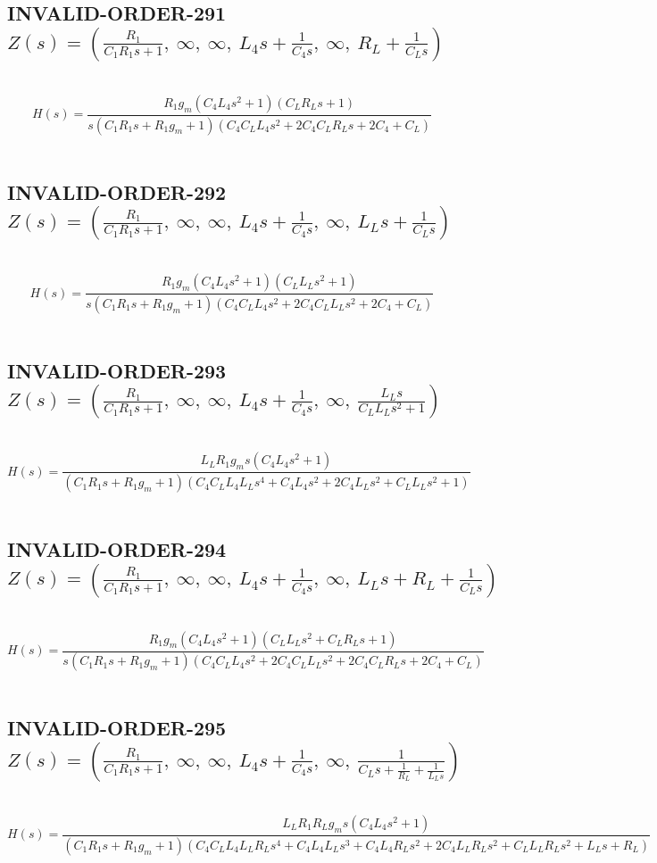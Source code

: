 \documentclass{article}
\begin{document}
\subsection{INVALID-ORDER-291 $Z(s) = \left( \frac{R_{1}}{C_{1} R_{1} s + 1}, \  \infty, \  \infty, \  L_{4} s + \frac{1}{C_{4} s}, \  \infty, \  R_{L} + \frac{1}{C_{L} s}\right)$ } \ 
\textbf{\[H(s) = \frac{R_{1} g_{m} \left(C_{4} L_{4} s^{2} + 1\right) \left(C_{L} R_{L} s + 1\right)}{s \left(C_{1} R_{1} s + R_{1} g_{m} + 1\right) \left(C_{4} C_{L} L_{4} s^{2} + 2 C_{4} C_{L} R_{L} s + 2 C_{4} + C_{L}\right)}\] } \ 
\subsection{INVALID-ORDER-292 $Z(s) = \left( \frac{R_{1}}{C_{1} R_{1} s + 1}, \  \infty, \  \infty, \  L_{4} s + \frac{1}{C_{4} s}, \  \infty, \  L_{L} s + \frac{1}{C_{L} s}\right)$ } \ 
\textbf{\[H(s) = \frac{R_{1} g_{m} \left(C_{4} L_{4} s^{2} + 1\right) \left(C_{L} L_{L} s^{2} + 1\right)}{s \left(C_{1} R_{1} s + R_{1} g_{m} + 1\right) \left(C_{4} C_{L} L_{4} s^{2} + 2 C_{4} C_{L} L_{L} s^{2} + 2 C_{4} + C_{L}\right)}\] } \ 
\subsection{INVALID-ORDER-293 $Z(s) = \left( \frac{R_{1}}{C_{1} R_{1} s + 1}, \  \infty, \  \infty, \  L_{4} s + \frac{1}{C_{4} s}, \  \infty, \  \frac{L_{L} s}{C_{L} L_{L} s^{2} + 1}\right)$ } \ 
\textbf{\[H(s) = \frac{L_{L} R_{1} g_{m} s \left(C_{4} L_{4} s^{2} + 1\right)}{\left(C_{1} R_{1} s + R_{1} g_{m} + 1\right) \left(C_{4} C_{L} L_{4} L_{L} s^{4} + C_{4} L_{4} s^{2} + 2 C_{4} L_{L} s^{2} + C_{L} L_{L} s^{2} + 1\right)}\] } \ 
\subsection{INVALID-ORDER-294 $Z(s) = \left( \frac{R_{1}}{C_{1} R_{1} s + 1}, \  \infty, \  \infty, \  L_{4} s + \frac{1}{C_{4} s}, \  \infty, \  L_{L} s + R_{L} + \frac{1}{C_{L} s}\right)$ } \ 
\textbf{\[H(s) = \frac{R_{1} g_{m} \left(C_{4} L_{4} s^{2} + 1\right) \left(C_{L} L_{L} s^{2} + C_{L} R_{L} s + 1\right)}{s \left(C_{1} R_{1} s + R_{1} g_{m} + 1\right) \left(C_{4} C_{L} L_{4} s^{2} + 2 C_{4} C_{L} L_{L} s^{2} + 2 C_{4} C_{L} R_{L} s + 2 C_{4} + C_{L}\right)}\] } \ 
\subsection{INVALID-ORDER-295 $Z(s) = \left( \frac{R_{1}}{C_{1} R_{1} s + 1}, \  \infty, \  \infty, \  L_{4} s + \frac{1}{C_{4} s}, \  \infty, \  \frac{1}{C_{L} s + \frac{1}{R_{L}} + \frac{1}{L_{L} s}}\right)$ } \ 
\textbf{\[H(s) = \frac{L_{L} R_{1} R_{L} g_{m} s \left(C_{4} L_{4} s^{2} + 1\right)}{\left(C_{1} R_{1} s + R_{1} g_{m} + 1\right) \left(C_{4} C_{L} L_{4} L_{L} R_{L} s^{4} + C_{4} L_{4} L_{L} s^{3} + C_{4} L_{4} R_{L} s^{2} + 2 C_{4} L_{L} R_{L} s^{2} + C_{L} L_{L} R_{L} s^{2} + L_{L} s + R_{L}\right)}\] } \ 
\end{document}
